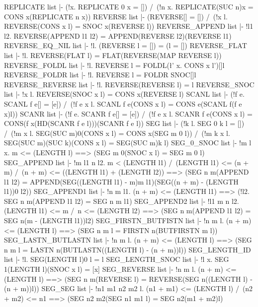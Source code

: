 \ENDTHEOREM
\THEOREM REPLICATE list
|- (!x. REPLICATE 0 x = []) /\
   (!n x. REPLICATE(SUC n)x = CONS x(REPLICATE n x))
\ENDTHEOREM
\THEOREM REVERSE list
|- (REVERSE[] = []) /\ (!x l. REVERSE(CONS x l) = SNOC x(REVERSE l))
\ENDTHEOREM
\THEOREM REVERSE\_APPEND list
|- !l1 l2. REVERSE(APPEND l1 l2) = APPEND(REVERSE l2)(REVERSE l1)
\ENDTHEOREM
\THEOREM REVERSE\_EQ\_NIL list
|- !l. (REVERSE l = []) = (l = [])
\ENDTHEOREM
\THEOREM REVERSE\_FLAT list
|- !l. REVERSE(FLAT l) = FLAT(REVERSE(MAP REVERSE l))
\ENDTHEOREM
\THEOREM REVERSE\_FOLDL list
|- !l. REVERSE l = FOLDL(\l' x. CONS x l')[]l
\ENDTHEOREM
\THEOREM REVERSE\_FOLDR list
|- !l. REVERSE l = FOLDR SNOC[]l
\ENDTHEOREM
\THEOREM REVERSE\_REVERSE list
|- !l. REVERSE(REVERSE l) = l
\ENDTHEOREM
\THEOREM REVERSE\_SNOC list
|- !x l. REVERSE(SNOC x l) = CONS x(REVERSE l)
\ENDTHEOREM
\THEOREM SCANL list
|- (!f e. SCANL f e[] = [e]) /\
   (!f e x l. SCANL f e(CONS x l) = CONS e(SCANL f(f e x)l))
\ENDTHEOREM
\THEOREM SCANR list
|- (!f e. SCANR f e[] = [e]) /\
   (!f e x l.
     SCANR f e(CONS x l) = CONS(f x(HD(SCANR f e l)))(SCANR f e l))
\ENDTHEOREM
\THEOREM SEG list
|- (!k l. SEG 0 k l = []) /\
   (!m x l. SEG(SUC m)0(CONS x l) = CONS x(SEG m 0 l)) /\
   (!m k x l. SEG(SUC m)(SUC k)(CONS x l) = SEG(SUC m)k l)
\ENDTHEOREM
\THEOREM SEG\_0\_SNOC list
|- !m l x. m <= (LENGTH l) ==> (SEG m 0(SNOC x l) = SEG m 0 l)
\ENDTHEOREM
\THEOREM SEG\_APPEND list
|- !m l1 n l2.
    m < (LENGTH l1) /\
    (LENGTH l1) <= (n + m) /\
    (n + m) <= ((LENGTH l1) + (LENGTH l2)) ==>
    (SEG n m(APPEND l1 l2) =
     APPEND(SEG((LENGTH l1) - m)m l1)(SEG((n + m) - (LENGTH l1))0 l2))
\ENDTHEOREM
\THEOREM SEG\_APPEND1 list
|- !n m l1.
    (n + m) <= (LENGTH l1) ==> (!l2. SEG n m(APPEND l1 l2) = SEG n m l1)
\ENDTHEOREM
\THEOREM SEG\_APPEND2 list
|- !l1 m n l2.
    (LENGTH l1) <= m /\ n <= (LENGTH l2) ==>
    (SEG n m(APPEND l1 l2) = SEG n(m - (LENGTH l1))l2)
\ENDTHEOREM
\THEOREM SEG\_FIRSTN\_BUTFISTN list
|- !n m l.
    (n + m) <= (LENGTH l) ==> (SEG n m l = FIRSTN n(BUTFIRSTN m l))
\ENDTHEOREM
\THEOREM SEG\_LASTN\_BUTLASTN list
|- !n m l.
    (n + m) <= (LENGTH l) ==>
    (SEG n m l = LASTN n(BUTLASTN((LENGTH l) - (n + m))l))
\ENDTHEOREM
\THEOREM SEG\_LENGTH\_ID list
|- !l. SEG(LENGTH l)0 l = l
\ENDTHEOREM
\THEOREM SEG\_LENGTH\_SNOC list
|- !l x. SEG 1(LENGTH l)(SNOC x l) = [x]
\ENDTHEOREM
\THEOREM SEG\_REVERSE list
|- !n m l.
    (n + m) <= (LENGTH l) ==>
    (SEG n m(REVERSE l) = REVERSE(SEG n((LENGTH l) - (n + m))l))
\ENDTHEOREM
\THEOREM SEG\_SEG list
|- !n1 m1 n2 m2 l.
    (n1 + m1) <= (LENGTH l) /\ (n2 + m2) <= n1 ==>
    (SEG n2 m2(SEG n1 m1 l) = SEG n2(m1 + m2)l)
